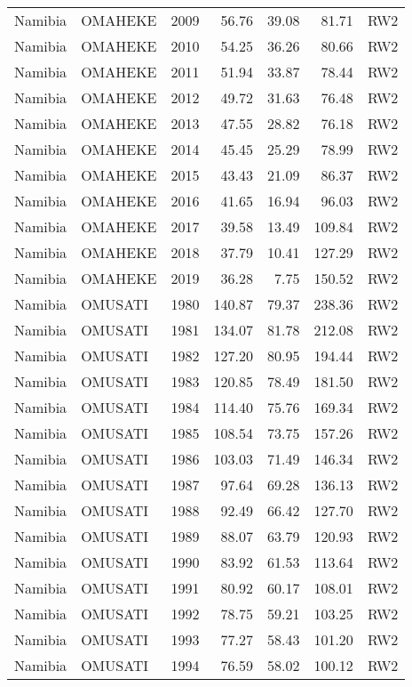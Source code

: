 \begin{longtable}{lllrrrl}
  Namibia & OMAHEKE & 2009 & 56.76 & 39.08 & 81.71 & RW2 \\ 
  Namibia & OMAHEKE & 2010 & 54.25 & 36.26 & 80.66 & RW2 \\ 
  Namibia & OMAHEKE & 2011 & 51.94 & 33.87 & 78.44 & RW2 \\ 
  Namibia & OMAHEKE & 2012 & 49.72 & 31.63 & 76.48 & RW2 \\ 
  Namibia & OMAHEKE & 2013 & 47.55 & 28.82 & 76.18 & RW2 \\ 
  Namibia & OMAHEKE & 2014 & 45.45 & 25.29 & 78.99 & RW2 \\ 
  Namibia & OMAHEKE & 2015 & 43.43 & 21.09 & 86.37 & RW2 \\ 
  Namibia & OMAHEKE & 2016 & 41.65 & 16.94 & 96.03 & RW2 \\ 
  Namibia & OMAHEKE & 2017 & 39.58 & 13.49 & 109.84 & RW2 \\ 
  Namibia & OMAHEKE & 2018 & 37.79 & 10.41 & 127.29 & RW2 \\ 
  Namibia & OMAHEKE & 2019 & 36.28 & 7.75 & 150.52 & RW2 \\ 
  Namibia & OMUSATI & 1980 & 140.87 & 79.37 & 238.36 & RW2 \\ 
  Namibia & OMUSATI & 1981 & 134.07 & 81.78 & 212.08 & RW2 \\ 
  Namibia & OMUSATI & 1982 & 127.20 & 80.95 & 194.44 & RW2 \\ 
  Namibia & OMUSATI & 1983 & 120.85 & 78.49 & 181.50 & RW2 \\ 
  Namibia & OMUSATI & 1984 & 114.40 & 75.76 & 169.34 & RW2 \\ 
  Namibia & OMUSATI & 1985 & 108.54 & 73.75 & 157.26 & RW2 \\ 
  Namibia & OMUSATI & 1986 & 103.03 & 71.49 & 146.34 & RW2 \\ 
  Namibia & OMUSATI & 1987 & 97.64 & 69.28 & 136.13 & RW2 \\ 
  Namibia & OMUSATI & 1988 & 92.49 & 66.42 & 127.70 & RW2 \\ 
  Namibia & OMUSATI & 1989 & 88.07 & 63.79 & 120.93 & RW2 \\ 
  Namibia & OMUSATI & 1990 & 83.92 & 61.53 & 113.64 & RW2 \\ 
  Namibia & OMUSATI & 1991 & 80.92 & 60.17 & 108.01 & RW2 \\ 
  Namibia & OMUSATI & 1992 & 78.75 & 59.21 & 103.25 & RW2 \\ 
  Namibia & OMUSATI & 1993 & 77.27 & 58.43 & 101.20 & RW2 \\ 
  Namibia & OMUSATI & 1994 & 76.59 & 58.02 & 100.12 & RW2 \\ 

\end{longtable}
